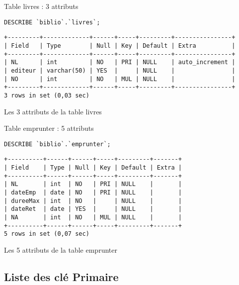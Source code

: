 \documentclass{article}
\begin{document}
\begin{center}
\vspace*{20pt}

\begin{minipage}{0.8\linewidth}
Table livres : 3 attributs
\begin{listing}[H]
\begin{verbatim}
DESCRIBE `biblio`.`livres`;
\end{verbatim}
\begin{verbatim}
+---------+-------------+------+-----+---------+----------------+
| Field   | Type        | Null | Key | Default | Extra          |
+---------+-------------+------+-----+---------+----------------+
| NL      | int         | NO   | PRI | NULL    | auto_increment |
| editeur | varchar(50) | YES  |     | NULL    |                |
| NO      | int         | NO   | MUL | NULL    |                |
+---------+-------------+------+-----+---------+----------------+
3 rows in set (0,03 sec)
\end{verbatim}
\caption{Les 3 attributs de la table livres}
\end{listing}
\end{minipage}

\vspace*{20pt}

\begin{minipage}{0.8\linewidth}
Table emprunter : 5 attributs
\begin{listing}[H]
\begin{verbatim}
DESCRIBE `biblio`.`emprunter`;
\end{verbatim}
\begin{verbatim}
+----------+------+------+-----+---------+-------+
| Field    | Type | Null | Key | Default | Extra |
+----------+------+------+-----+---------+-------+
| NL       | int  | NO   | PRI | NULL    |       |
| dateEmp  | date | NO   | PRI | NULL    |       |
| dureeMax | int  | NO   |     | NULL    |       |
| dateRet  | date | YES  |     | NULL    |       |
| NA       | int  | NO   | MUL | NULL    |       |
+----------+------+------+-----+---------+-------+
5 rows in set (0,07 sec)
\end{verbatim}
\caption{Les 5 attributs de la table emprunter}
\end{listing}
\end{minipage}
\end{center}


\newpage
\subsection{Liste des clé Primaire}
\end{document}
